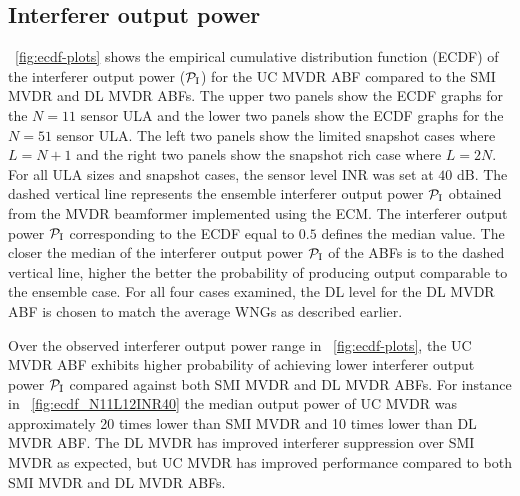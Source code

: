 \subsection{Interferer output power}
\label{sec:ucmvdr-interf-outp-result}
\figurename{}~\ref{fig:ecdf-plots} shows the empirical cumulative
distribution function (ECDF) of the interferer output power
($\mathcal{P}_{\rm I}$) for the UC MVDR ABF compared to the SMI MVDR and DL MVDR
ABFs. The upper two panels show the ECDF graphs for the $N = 11$
sensor ULA and the lower two panels show the ECDF graphs for the $N =
51$ sensor ULA. The left two panels show the limited snapshot cases
where $L = N + 1$ and the right two panels show the snapshot rich case
where $L = 2N$. For all ULA sizes and snapshot cases, the sensor level
INR was set at $40$ dB. The dashed vertical line represents the
ensemble interferer output power $\mathcal{P}_{\rm I}$ obtained from the MVDR
beamformer implemented using the ECM. The interferer output power
$\mathcal{P}_{\rm I}$ corresponding to the ECDF equal to $0.5$ defines the median
value. The closer the median of the interferer output power $\mathcal{P}_{\rm I}$
of the ABFs is to the dashed vertical line, higher the better the
probability of producing output comparable to the ensemble case. For
all four cases examined, the DL level for the DL MVDR ABF is chosen to
match the average WNGs as described earlier.

Over the observed interferer output power range in
\figurename{}~\ref{fig:ecdf-plots}, the UC MVDR ABF exhibits
higher probability of achieving lower interferer output power
$\mathcal{P}_{\rm I}$ compared
against both SMI MVDR and DL MVDR ABFs. For instance in
\figurename{}~\ref{fig:ecdf_N11L12INR40} the median output power of UC
MVDR was approximately 20 times lower than SMI MVDR and 10 times lower
than DL MVDR ABF. The DL MVDR has improved interferer
suppression over SMI MVDR as expected, but UC MVDR has improved
performance compared to both SMI MVDR and DL MVDR ABFs.

